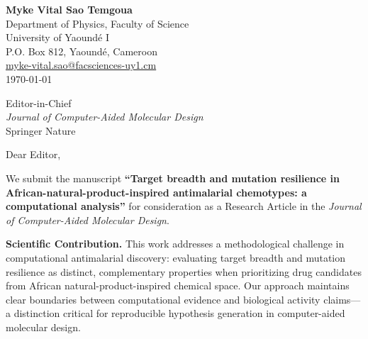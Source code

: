 \documentclass[11pt,letterpaper]{article}
\begin{document}
\begin{flushleft}
\textbf{Myke Vital Sao Temgoua} \\
Department of Physics, Faculty of Science \\
University of Yaound\'{e} I \\
P.O. Box 812, Yaound\'{e}, Cameroon \\
\href{mailto:myke-vital.sao@facsciences-uy1.cm}{myke-vital.sao@facsciences-uy1.cm} \\[1em]
\today
\end{flushleft}

\begin{flushleft}
Editor-in-Chief \\
\textit{Journal of Computer-Aided Molecular Design} \\
Springer Nature
\end{flushleft}

\vspace{0.5em}

\noindent Dear Editor,

We submit the manuscript \textbf{``Target breadth and mutation resilience in African-natural-product-inspired antimalarial chemotypes: a computational analysis''} for consideration as a Research Article in the \textit{Journal of Computer-Aided Molecular Design}.

\vspace{0.3em}

\noindent\textbf{Scientific Contribution.}
This work addresses a methodological challenge in computational antimalarial discovery: evaluating target breadth and mutation resilience as distinct, complementary properties when prioritizing drug candidates from African natural-product-inspired chemical space. Our approach maintains clear boundaries between computational evidence and biological activity claims---a distinction critical for reproducible hypothesis generation in computer-aided molecular design.
\end{document}
